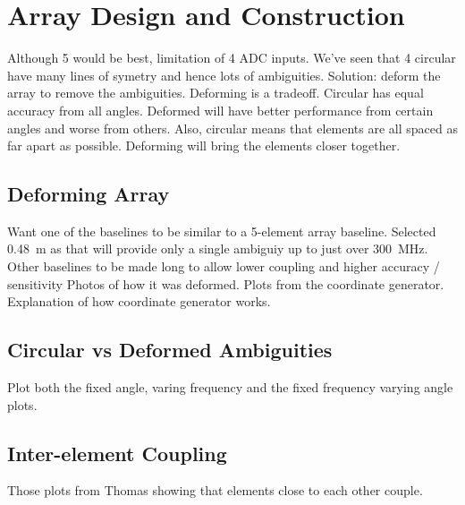 \chapter{Array Design and Construction}
\graphicspath{{./img/array-construction/}}

Although 5 would be best, limitation of 4 ADC inputs.
We've seen that 4 circular have many lines of symetry and hence lots of ambiguities.
Solution: deform the array to remove the ambiguities.
Deforming is a tradeoff.
Circular has equal accuracy from all angles. Deformed will have better performance from certain angles and worse from others.
Also, circular means that elements are all spaced as far apart as possible. Deforming will bring the elements closer together.

\section{Deforming Array}
Want one of the baselines to be similar to a 5-element array baseline. Selected \SI{0.48}{\meter} as that will provide only a single ambiguiy up to just over \SI{300}{\mega\hertz}.
Other baselines to be made long to allow lower coupling and higher accuracy / sensitivity
Photos of how it was deformed.
Plots from the coordinate generator. Explanation of how coordinate generator works.

\section{Circular vs Deformed Ambiguities}
Plot both the fixed angle, varing frequency and the fixed frequency varying angle plots.


\section{Inter-element Coupling}
Those plots from Thomas showing that elements close to each other couple.

